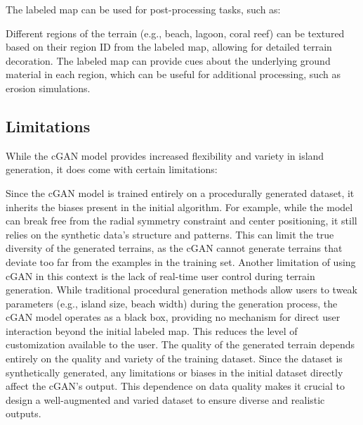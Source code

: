 The labeled map can be used for post-processing tasks, such as:
\begin{Itemize}
     Different regions of the terrain (e.g., beach, lagoon, coral reef) can be textured based on their region ID from the labeled map, allowing for detailed terrain decoration.
     The labeled map can provide cues about the underlying ground material in each region, which can be useful for additional processing, such as erosion simulations.
\end{Itemize}


\subsection{Limitations}

While the cGAN model provides increased flexibility and variety in island generation, it does come with certain limitations:

\begin{Itemize}
     Since the cGAN model is trained entirely on a procedurally generated dataset, it inherits the biases present in the initial algorithm. For example, while the model can break free from the radial symmetry constraint and center positioning, it still relies on the synthetic data's structure and patterns. This can limit the true diversity of the generated terrains, as the cGAN cannot generate terrains that deviate too far from the examples in the training set.
     Another limitation of using cGAN in this context is the lack of real-time user control during terrain generation. While traditional procedural generation methods allow users to tweak parameters (e.g., island size, beach width) during the generation process, the cGAN model operates as a black box, providing no mechanism for direct user interaction beyond the initial labeled map. This reduces the level of customization available to the user.
     The quality of the generated terrain depends entirely on the quality and variety of the training dataset. Since the dataset is synthetically generated, any limitations or biases in the initial dataset directly affect the cGAN's output. This dependence on data quality makes it crucial to design a well-augmented and varied dataset to ensure diverse and realistic outputs.
\end{Itemize}



